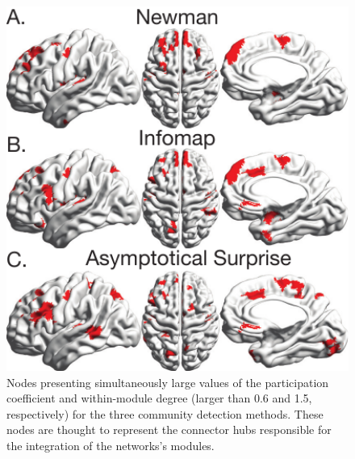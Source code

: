 \begin{figure}[!ht]
\includegraphics[width=1.0\textwidth]{images/large_values_participation.pdf}
\caption{Nodes presenting simultaneously large values of the participation coefficient and  within-module degree (larger than 0.6 and 1.5, respectively) for the three community detection methods. These nodes are thought to represent the connector hubs responsible for the integration of the networks's modules.
}
\label{fig:hubclassification_threshold}
\end{figure}
